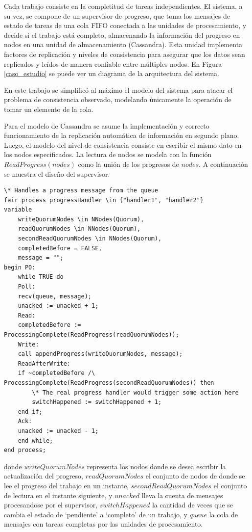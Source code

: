 \documentclass[runningheads]{llncs}
\begin{document}
Cada trabajo consiste en la completitud de tareas independientes. El sistema, a su vez, se compone de un supervisor de progreso, que toma los mensajes de estado de tareas de una cola FIFO conectada a las unidades de procesamiento, y decide si el trabajo está completo, almacenando la información del progreso en nodos en una unidad de almacenamiento (Cassandra). Esta unidad implementa factores de replicación y niveles de consistencia para asegurar que los datos sean replicados y leídos de manera confiable entre múltiples nodos. En Figura \ref{caso_estudio} se puede ver un diagrama de la arquitectura del sistema. 

En este trabajo se simplificó al máximo el modelo del sistema para atacar el problema de consistencia observado, modelando únicamente la operación de tomar un elemento de la cola.

Para el modelo de Cassandra se asume la implementación y correcto funcionamiento de la replicación automática de información en segundo plano. Luego, el modelo del nivel de consistencia consiste en escribir el mismo dato en los nodos especificados. La lectura de nodos se modela con la función $ReadProgress(nodes)$ como la unión de los progresos de $nodes$. A continuación se muestra el diseño del supervisor.

\begin{lstlisting}
\* Handles a progress message from the queue
fair process progressHandler \in {"handler1", "handler2"}
variable
    writeQuorumNodes \in NNodes(Quorum),
    readQuorumNodes \in NNodes(Quorum),
    secondReadQuorumNodes \in NNodes(Quorum),
    completedBefore = FALSE,
    message = "";
begin P0:
    while TRUE do
    Poll:
    recv(queue, message);
    unacked := unacked + 1;
    Read:
    completedBefore := ProcessingComplete(ReadProgress(readQuorumNodes));
    Write:
    call appendProgress(writeQuorumNodes, message);
    ReadAfterWrite:
    if ~completedBefore /\ ProcessingComplete(ReadProgress(secondReadQuorumNodes)) then
        \* The real progress handler would trigger some action here
        switchHappened := switchHappened + 1;
    end if;
    Ack:
    unacked := unacked - 1;
    end while;
end process;    
\end{lstlisting}

donde $writeQuorumNodes$ representa los nodos donde se desea escribir la actualización del progreso, $readQuorumNodes$ el conjunto de nodos de donde se lee el progreso del trabajo en un instante, $secondReadQuorumNodes$ el conjunto de lectura en el instante siguiente, y $unacked$ lleva la cuenta de mensajes procesandose por el supervisor, $switchHappened$ la cantidad de veces que se cambia el estado de ‘pendiente’ a ‘completo’ de un trabajo, y $queue$ la cola de mensajes con tareas completas por las unidades de procesamiento.
\end{document}
